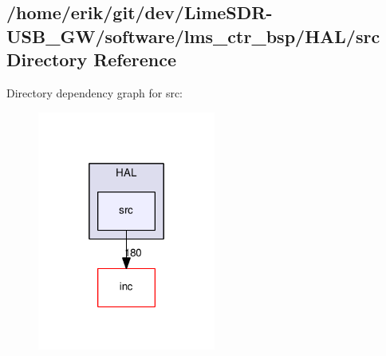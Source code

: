 \subsection{/home/erik/git/dev/\+Lime\+S\+D\+R-\/\+U\+S\+B\+\_\+\+G\+W/software/lms\+\_\+ctr\+\_\+bsp/\+H\+A\+L/src Directory Reference}
\label{dir_b8bb0787aecbe00afff41686d76ba91b}
Directory dependency graph for src\+:
\nopagebreak
\begin{figure}[H]
\begin{center}
\leavevmode
\includegraphics[width=166pt]{dir_b8bb0787aecbe00afff41686d76ba91b_dep}
\end{center}
\end{figure}
